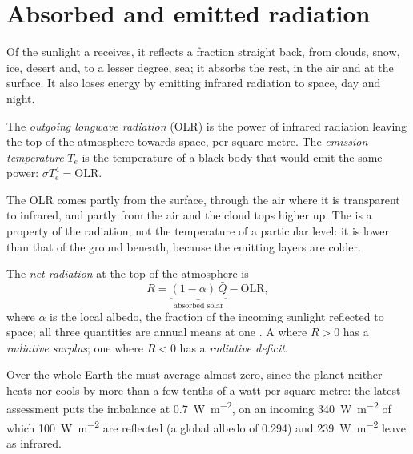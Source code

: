 \section{Absorbed and emitted radiation}\label{sec:b1:radiation-heat-transport:toa}

Of the sunlight a  receives, it reflects a fraction straight back, from
clouds, snow, ice, desert and, to a lesser degree, sea; it absorbs the rest, in
the air and at the surface. It also loses energy by emitting infrared radiation
to space, day and night.

\begin{definition}\label{def:b1:radiation-heat-transport:olr}
The \emph{outgoing longwave radiation} (OLR)
is the power of infrared radiation leaving the top of the atmosphere towards space,
per square metre. The \emph{emission temperature}
$T_e$ is the temperature of a black body that would emit the same power:
$\sigma T_e^4 = \text{OLR}$.
\end{definition}

The OLR comes partly from the surface, through the air where it is transparent
to infrared, and partly from the air and the cloud tops higher up. The  is a property of
the radiation, not the temperature of a particular level: it is lower than that
of the ground beneath, because the emitting layers are colder.

\begin{definition}\label{def:b1:radiation-heat-transport:net-radiation}
The \emph{net radiation} at the top of the atmosphere is
\[
  R = \underbrace{(1 - \alpha)\,\bar Q}_{\text{absorbed solar}} - \text{OLR},
\]
where $\alpha$ is the local albedo, the fraction of the incoming sunlight reflected
to space; all three quantities are annual means at one . A  where
$R > 0$ has a \emph{radiative surplus}; one where $R < 0$
has a \emph{radiative deficit}.
\end{definition}

Over the whole Earth the  must average almost zero, since the planet
neither heats nor cools by more than a few tenths of a watt per square metre: the
latest assessment puts the imbalance at \qty{0.7}{W.m^{-2}}, on an incoming
\qty{340}{W.m^{-2}} of which \qty{100}{W.m^{-2}} are reflected (a global albedo of
\num{0.294}) and \qty{239}{W.m^{-2}} leave as infrared.

